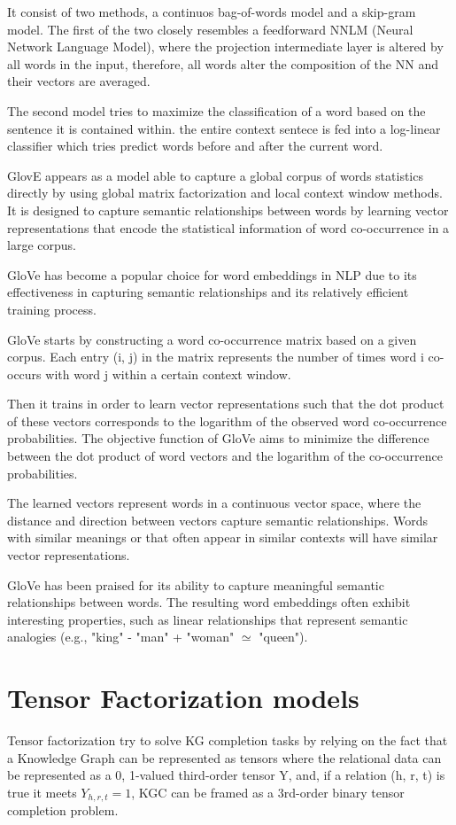 It consist of two methods, a continuos bag-of-words model and a skip-gram model. The first of the two closely resembles a feedforward NNLM (Neural Network Language Model), where the projection intermediate layer is altered by all words in the input, therefore, all words alter the composition of the NN and their vectors are averaged.

The second model tries to maximize the classification of a word based on the sentence it is contained within. the entire context sentece is fed into a log-linear classifier which tries predict words before and after the current word.

GlovE \cite{} appears as a model able to capture a global corpus of words  statistics directly by using global matrix factorization and local context window methods. It is designed to capture semantic relationships between words by learning vector representations that encode the statistical information of word co-occurrence in a large corpus.

GloVe has become a popular choice for word embeddings in NLP due to its effectiveness in capturing semantic relationships and its relatively efficient training process.

GloVe starts by constructing a word co-occurrence matrix based on a given corpus. Each entry (i, j) in the matrix represents the number of times word i co-occurs with word j within a certain context window.

Then it trains in order to learn vector representations such that the dot product of these vectors corresponds to the logarithm of the observed word co-occurrence probabilities. The objective function of GloVe aims to minimize the difference between the dot product of word vectors and the logarithm of the co-occurrence probabilities.

The learned vectors represent words in a continuous vector space, where the distance and direction between vectors capture semantic relationships. Words with similar meanings or that often appear in similar contexts will have similar vector representations.

GloVe has been praised for its ability to capture meaningful semantic relationships between words. The resulting word embeddings often exhibit interesting properties, such as linear relationships that represent semantic analogies (e.g., "king" - "man" + "woman" $\simeq$ "queen").


\section{Tensor Factorization models}\label{sec:emb-tensor}
Tensor factorization try to solve KG completion tasks by relying on the fact that a Knowledge Graph can be represented as tensors where the relational data can be represented as a {0, 1}-valued third-order tensor Y, and, if a relation (h, r, t) is true it meets $Y_{h,r,t} = 1$, KGC can be framed as a 3rd-order binary tensor completion problem.

